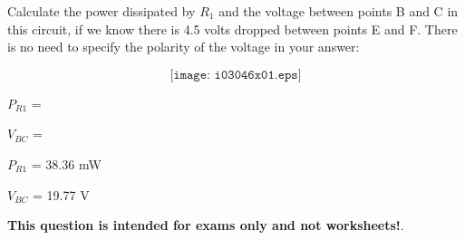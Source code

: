

Calculate the power dissipated by $R_1$ and the voltage between points B and C in this circuit, if we know there is 4.5 volts dropped between points E and F.  There is no need to specify the polarity of the voltage in your answer:

$$\texttt{[image: i03046x01.eps]}$$

$P_{R1}$ = 

\vskip 10pt

$V_{BC}$ = 

\vskip 10pt







$P_{R1}$ = 38.36 mW

\vskip 10pt

$V_{BC}$ = 19.77 V







{\bf This question is intended for exams only and not worksheets!}.


